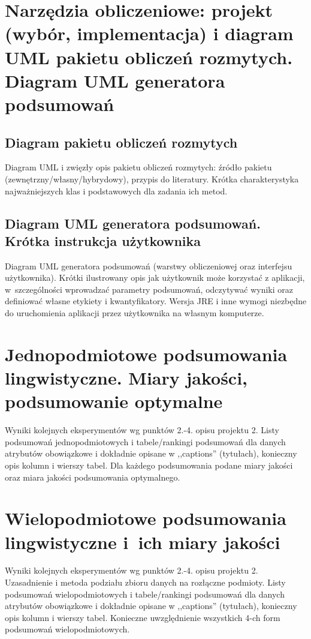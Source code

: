 \documentclass{classrep}
\begin{document}
\section{Narzędzia obliczeniowe: projekt (wybór, implementacja) i diagram UML pakietu obliczeń rozmytych. Diagram UML generatora podsumowań}
\subsection{Diagram pakietu obliczeń rozmytych}
Diagram UML i zwięzły opis pakietu obliczeń rozmytych: źródło pakietu
(zewnętrzny/własny/hybrydowy), przypis do literatury. Krótka charakterystyka
najważniejszych klas i podstawowych dla zadania ich metod. \\

\subsection{Diagram UML generatora podsumowań. Krótka instrukcja użytkownika} 
Diagram UML generatora podsumowań (warstwy obliczeniowej oraz interfejsu
użytkownika). Krótki ilustrowany opis jak użytkownik może korzystać z aplikacji, w~szczególności
wprowadzać parametry  podsumowań, odczytywać wyniki oraz definiować własne etykiety i
kwantyfikatory. Wersja JRE i inne wymogi niezbędne do uruchomienia aplikacji przez użytkownika na własnym komputerze. \\

\section{ Jednopodmiotowe podsumowania lingwistyczne. Miary jakości, podsumowanie optymalne}
Wyniki kolejnych eksperymentów wg punktów 2.-4. opisu projektu 2.  Listy podsumowań
jednopodmiotowych i tabele/rankingi podsumowań dla danych atrybutów obowiązkowe i dokładnie opisane w ,,captions'' (tytułach), konieczny opis kolumn i wierszy tabel. Dla każdego podsumowania podane miary jakości oraz miara jakości podsumowania
optymalnego.\\



\section{Wielopodmiotowe podsumowania lingwistyczne i~ich miary jakości} 
Wyniki kolejnych eksperymentów wg punktów 2.-4. opisu projektu 2. Uzasadnienie i
metoda podziału zbioru danych na rozłączne podmioty. Listy podsumowań
wielopodmiotowych i tabele/rankingi podsumowań dla danych atrybutów obowiązkowe i
dokładnie opisane w ,,captions'' (tytułach), konieczny opis kolumn i wierszy tabel.
Konieczne uwzględnienie wszystkich 4-ch form podsumowań wielopodmiotowych. 
\\ 
\end{document}
